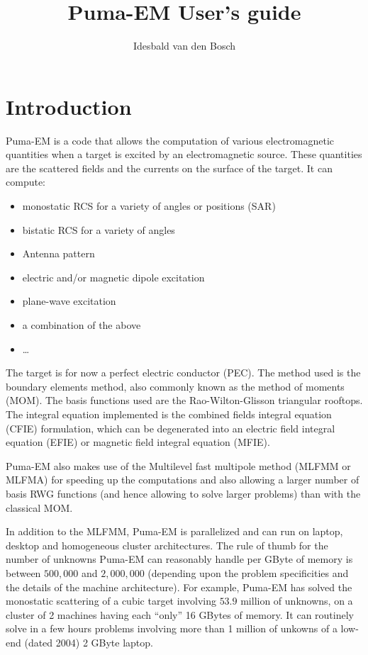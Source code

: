 \documentclass[a4paper,10pt]{book}
\title{Puma-EM User's guide}
\author{Idesbald van den Bosch}
\begin{document}
\maketitle
\tableofcontents

\chapter{Introduction}
%
\par
Puma-EM is a code that allows the computation of various electromagnetic quantities when a target is excited by an electromagnetic source. These quantities are the scattered fields and the currents on the surface of the target. It can compute:
\begin{itemize}
\item monostatic RCS for a variety of angles or positions (SAR)
\item bistatic RCS for a variety of angles
\item Antenna pattern
\item electric and/or magnetic dipole excitation
\item plane-wave excitation
\item a combination of the above
\item \ldots
\end{itemize}
%
\par
The target is for now a perfect electric conductor (PEC). The method used is the boundary elements method, also commonly known as the method of moments (MOM). The basis functions used are the Rao-Wilton-Glisson triangular rooftops. The integral equation implemented is the combined fields integral equation (CFIE) formulation, which can be degenerated into an electric field integral equation (EFIE) or magnetic field integral equation (MFIE). 
%
\par
Puma-EM also makes use of the Multilevel fast multipole method (MLFMM or MLFMA) for speeding up the computations and also allowing a larger number of basis RWG functions (and hence allowing to solve larger problems) than with the classical MOM. 
%
\par
In addition to the MLFMM, Puma-EM is parallelized and can run on laptop, desktop and homogeneous cluster architectures. The rule of thumb for the number of unknowns Puma-EM can reasonably handle per GByte of memory is between $500,000$ and $2,000,000$ (depending upon the problem specificities and the details of the machine architecture). For example, Puma-EM has solved the monostatic scattering of a cubic target involving $53.9$ million of unknowns, on a cluster of 2 machines having each ``only'' 16 GBytes of memory. It can routinely solve in a few hours problems involving more than 1 million of unkowns of a low-end (dated 2004) 2 GByte laptop.
\end{document}
